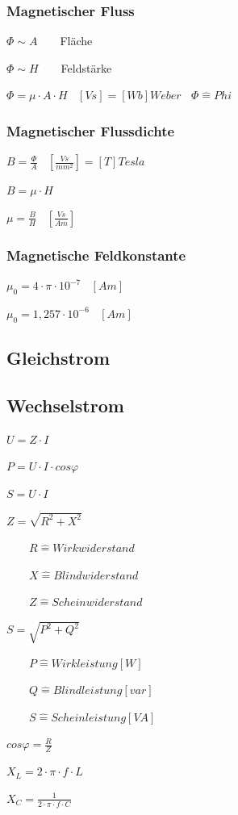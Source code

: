 \documentclass[12pt,a4paper]{article}
\begin{document}
\subsubsection{Magnetischer Fluss}
\begin{description}
\item $\Phi \sim A$~~~~Fläche
\item $\Phi \sim H$~~~~Feldstärke
\item $\Phi = \mu \cdot A \cdot H~~~~[Vs] = [Wb] Weber ~~~~ \Phi \widehat{=} Phi$
\end{description}

\subsubsection{Magnetischer Flussdichte}
\begin{description}
\item $B = \frac{\Phi}{A}~~~~[\frac{Vs}{mm^{2}}]=[T]Tesla$
\item $B = \mu \cdot H$
\item $\mu = \frac{B}{H}~~~~[\frac{Vs}{Am}]$
\end{description}
\subsubsection{Magnetische Feldkonstante}
\begin{description}
\item $\mu_{0} = 4 \cdot  \pi \cdot 10 ^{-7}~~~~[Am]$
\item $\mu_{0} = 1,257 \cdot 10 ^{-6}~~~~[Am]$
\end{description}
\subsection{Gleichstrom}
\subsection{Wechselstrom}
\begin{description}
\item $U=Z \cdot I$
\item $P=U \cdot I \cdot cos \varphi$
\item $S=U \cdot I$
\item $Z=\sqrt{R^{2}+X^{2}}$
\item ~~~~$R \widehat{=} Wirkwiderstand$
\item ~~~~$X \widehat{=} Blindwiderstand$
\item ~~~~$Z \widehat{=} Scheinwiderstand$
\item $S=\sqrt{P^{2}+Q^{2}}$
\item ~~~~$P \widehat{=} Wirkleistung [W]$
\item ~~~~$Q \widehat{=} Blindleistung [var]$
\item ~~~~$S \widehat{=} Scheinleistung [VA]$
\item $cos \varphi = \frac{R}{Z}$
\item $X_{L} = 2 \cdot \pi \cdot f \cdot L$
\item $X_{C} = \frac{1}{2 \cdot \pi \cdot f \cdot C} $
\end{description}
\end{document}
